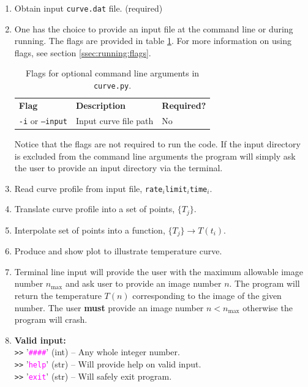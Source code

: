 \begin{enumerate}
	\item	Obtain input \texttt{curve.dat} file. (required)
	\item[]	%
		{One has the choice to provide an input file at the command line or during running. The flags are provided in table \ref{tab:misc:curve:flags}. For more information on using flags, see section \ref{ssec:running:flags}.
		
		\begin{table}[H]
			\begin{center}
				\begin{tabular}{l l l}
					\hline
					\textbf{Flag}	&	\textbf{Description}	&	\textbf{Required?}\\
					\texttt{-i} or \texttt{--input}		& Input curve file path	&	No	\\
					\hline
				\end{tabular}
			\end{center}
			\caption[Curve flags.]{\label{tab:misc:curve:flags}%
				Flags for optional command line arguments in \texttt{curve.py}.%
			}
		\end{table}
		Notice that the flags are not required to run the code. If the input directory is excluded from the command line arguments the program will simply ask the user to provide an input directory via the terminal.
		}
	\item	Read curve profile from input file, \colorbox{lightergray}{\texttt{rate$ _i $}\tab\texttt{limit$ _i $}\tab\texttt{time$ _i $}\tab}.
	\item	Translate curve profile into a set of points, $ \{T_j\} $.
	\item	Interpolate set of points into a function, $ \{T_j\} \rightarrow T(t_i) $.
	\item	Produce and show plot to illustrate temperature curve.
	\item	Terminal line input will provide the user with the maximum allowable image number $ n_\text{max} $ and ask user to provide an image number $ n $. The program will return the temperature $ T(n) $ corresponding to the image of the given number. The user \textbf{must} provide an image number $ n < n_\text{max} $ otherwise the program will crash.
	\item[]	\begin{hang}
				\textbf{Valid input:}  \\
					\texttt{>>} \tab '\textcolor{magenta}{\texttt{\#\#\#\#}}'	(int) -- Any whole integer number.\\
					\texttt{>>} \tab '\textcolor{magenta}{\texttt{help}}' (str) -- Will provide help on valid input.\\
					\texttt{>>} \tab '\textcolor{magenta}{\texttt{exit}}' (str) -- Will safely exit program.
			\end{hang} 
\end{enumerate}


